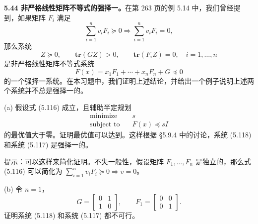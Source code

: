 \documentclass[UTF8,12pt,a4paper,fontset=fandol]{ctexart}
\begin{document}
\noindent\textbf{5.44 非严格线性矩阵不等式的强择一。}\quad 在第 263 页的例 5.14 中，我们曾经提到，如果矩阵 $F_i$ 满足
\begin{equation}
\sum_{i=1}^n v_iF_i\succeq 0\Longrightarrow \sum_{i=1}^n v_iF_i=0,
\tag{5.116}
\end{equation}
那么系统
\begin{equation}
Z\succeq 0,\qquad \mathbf{tr}(GZ)>0,\qquad \mathbf{tr}(F_iZ)=0,\quad i=1,\ldots,n
\tag{5.117}
\end{equation}
是非严格线性矩阵不等式系统
\begin{equation}
F(x)=x_1F_1+\cdots+x_nF_n+G\preceq 0
\tag{5.118}
\end{equation}
的一个强择一系统。在本习题中，我们证明上述结论，并给出一个例子说明上述两个系统并不总是强择一的。

(a) 假设式 (5.116) 成立，且辅助半定规划
\[
\begin{aligned}
\text{minimize}\quad & s\\
\text{subject to}\quad & F(x)\preceq sI
\end{aligned}
\]
的最优值大于零。证明最优值可以达到。这样根据 §5.9.4 中的讨论，系统 (5.118) 和系统 (5.117) 是强择一的。

提示：可以这样来简化证明。不失一般性，假设矩阵 $F_1,\ldots,F_n$ 是独立的，那么式 (5.116) 可以简化为 $\sum_{i=1}^n v_iF_i\succeq 0\Longrightarrow v=0$。

(b) 令 $n=1$，
\[
G=
\begin{bmatrix}
0 & 1\\
1 & 0
\end{bmatrix},\qquad
F_1=
\begin{bmatrix}
0 & 0\\
0 & 1
\end{bmatrix}.
\]
证明系统 (5.118) 和系统 (5.117) 都不可行。
\end{document}
